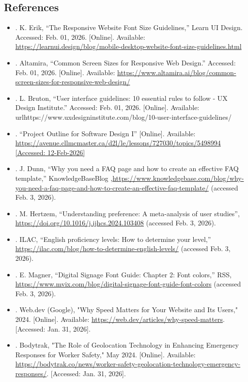 \documentclass[]{article}
\begin{document}
\subsection{References}
\label{sub:references}
\begin{itemize}
	\item[] [1]. K. Erik, “The Responsive Website Font Size Guidelines,” Learn UI Design. Accessed: Feb. 01, 2026. [Online]. Available: \url{https://learnui.design/blog/mobile-desktop-website-font-size-guidelines.html}
	\item[] [2]. Altamira, “Common Screen Sizes for Responsive Web Design.” Accessed: Feb. 01, 2026. [Online]. Available: \url{https://www.altamira.ai/blog/common-screen-sizes-for-responsive-web-design/}
	\item[] [3]. L. Bruton, “User interface guidelines: 10 essential rules to follow - UX Design Institute.” Accessed: Feb. 01, 2026. [Online]. Available: url{https://www.uxdesigninstitute.com/blog/10-user-interface-guidelines/}
	\item[] [4]. “Project Outline for Software Design I” [Online]. Available: \url{https://avenue.cllmcmaster.ca/d2l/le/lessons/727030/topics/5498994 [Accessed: 12-Feb-2026]}
	\item[] [5]. J. Dunn, “Why you need a FAQ page and how to create an effective FAQ template,” KnowledgeBaseBlog ,\url{https://www.knowledgebase.com/blog/why-you-need-a-faq-page-and-how-to-create-an-effective-faq-template/} (accessed Feb. 3, 2026).
	\item[] [6]. M. Hertzem, “Understanding preference: A meta-analysis of user studies”, \url{https://doi.org/10.1016/j.ijhcs.2024.103408} (accessed Feb. 3, 2026).
	\item[] [7]. ILAC, “English proficiency levels: How to determine your level,” \url{https://ilac.com/blog/how-to-determine-english-levels/} (accessed Feb. 3, 2026).
	\item[] [8]. E. Magner, “Digital Signage Font Guide: Chapter 2: Font colors,” RSS, \url{https://www.mvix.com/blog/digital-signage-font-guide-font-colors} (accessed Feb. 3, 2026).
	\item[] [9]. Web.dev (Google), "Why Speed Matters for Your Website and Its Users," 2024. [Online]. Available: \url{https://web.dev/articles/why-speed-matters}. [Accessed: Jan. 31, 2026].
	\item[] [10]. Bodytrak, "The Role of Geolocation Technology in Enhancing Emergency Responses for Worker Safety," May 2024. [Online]. Available: \url{https://bodytrak.co/news/worker-safety-geolocation-technology-emergency-responses/}. [Accessed: Jan. 31, 2026].

\end{itemize}
\end{document}
